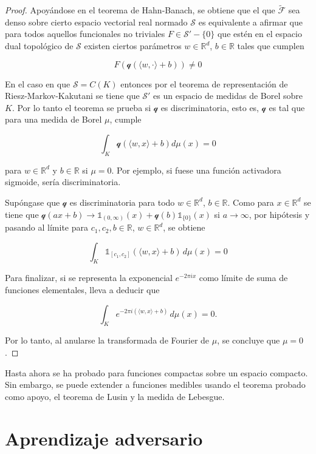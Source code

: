 \begin{proof}
Apoyándose en el teorema de Hahn-Banach, se obtiene que el que $\tilde{\mathcal{F}}$ sea denso sobre cierto espacio vectorial real normado $\mathcal{S}$ es equivalente a afirmar que para todos aquellos funcionales no triviales $F \in \mathcal{S}'-\{ 0 \}$ que estén en el espacio dual topológico de $\mathcal{S}$ existen ciertos parámetros $w \in \mathbb{R}^d$, $b \in \mathbb{R}$ tales que cumplen

$$F(\mathcal{q}(\langle w,\cdot \rangle + b)) \neq 0$$

En el caso en que $\mathcal{S} = C(K)$ entonces por el teorema de representación de Riesz-Markov-Kakutani se tiene que $\mathcal{S'}$ es un espacio de medidas de Borel sobre $K$. Por lo tanto el teorema se prueba si $\mathcal{q}$ es discriminatoria, esto es, $\mathcal{q}$ es tal que para una medida de Borel $\mu$, cumple

$$\int_{K} \mathcal{q}(\langle w,x \rangle + b)d\mu(x) = 0$$

para $w \in \mathbb{R}^d$ y $b \in \mathbb{R}$ si $\mu = 0$. Por ejemplo, si fuese una función activadora sigmoide, sería discriminatoria.

Supóngase que $\mathcal{q}$ es discriminatoria para todo $w \in \mathbb{R}^d$, $b \in \mathbb{R}$. Como para $x \in \mathbb{R}^d$ se tiene que $\mathcal{q}(ax+b) \to \mathbb{1}_{(0,\infty)}(x) + \mathcal{q}(b)\mathbb{1}_{\{0\}}(x)$ si $a \to \infty$, por hipótesis y pasando al límite para $c_1,c_2,b \in \mathbb{R}$, $w \in \mathbb{R}^d$, se obtiene

\[
\int_{K} \mathbb{1}_{[c_1,c_2]}(\langle w,x \rangle + b) \, d\mu(x) = 0
\]

Para finalizar, si se representa la exponencial $e^{-2\pi i x}$ como límite de suma de funciones elementales, lleva a deducir que

\[
\int_{K} e^{-2\pi i (\langle w,x\rangle + b)} \, d\mu(x) = 0.
\]

Por lo tanto, al anularse la transformada de Fourier de $\mu$, se concluye que $\mu = 0$.

\end{proof}

Hasta ahora se ha probado para funciones compactas sobre un espacio compacto. Sin embargo, se puede extender a funciones medibles usando el teorema probado como apoyo, el teorema de Lusin y la medida de Lebesgue.

\section{Aprendizaje adversario}

